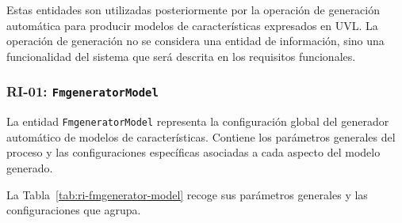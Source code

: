 Estas entidades son utilizadas posteriormente por la operación de generación automática para producir modelos de características expresados en UVL. La operación de generación no se considera una entidad de información, sino una funcionalidad del sistema que será descrita en los requisitos funcionales.

\subsubsection*{RI-01: \texttt{FmgeneratorModel}}

La entidad \texttt{FmgeneratorModel} representa la configuración global del generador automático de modelos de características. Contiene los parámetros generales del proceso y las configuraciones específicas asociadas a cada aspecto del modelo generado.

La Tabla~\ref{tab:ri-fmgenerator-model} recoge sus parámetros generales y las configuraciones que agrupa.

